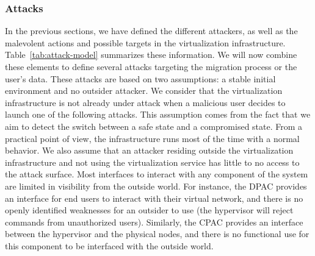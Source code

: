 \subsubsection{Attacks}
\label{sec:attacks}
In the previous sections, we have defined the different attackers, as well as the malevolent actions and possible targets in the virtualization infrastructure. 
Table~\ref{tab:attack-model} summarizes these information.
We will now combine these elements to define several attacks targeting the migration process or the user's data.
These attacks are based on two assumptions: a stable initial environment and no outsider attacker.
We consider that the virtualization infrastructure is not already under attack when a malicious user decides to launch one of the following attacks.
This assumption comes from the fact that we aim to detect the switch between a safe state and a compromised state. From a practical point of view, the infrastructure runs most of the time with a normal behavior.
We also assume that an attacker residing outside the virtualization infrastructure and not using the virtualization service has little to no access to the attack surface.
Most interfaces to interact with any component of the system are limited in visibility from the outside world.
For instance, the DPAC provides an interface for end users to interact with their virtual network, and there is no openly identified weaknesses for an outsider to use (\ie the hypervisor will reject commands from unauthorized users).
Similarly, the CPAC provides an interface between the hypervisor and the physical nodes, and there is no functional use for this component to be interfaced with the outside world.

